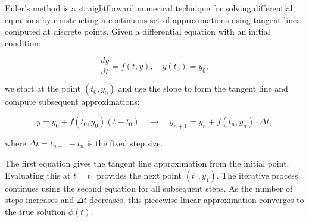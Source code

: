 Euler's method is a straightforward numerical technique for solving differential equations by constructing a continuous set of approximations using tangent lines computed at discrete points.
Given a differential equation with an initial condition:

\[
\frac{dy}{dt} = f(t, y), \quad y(t_0) = y_0,
\]

we start at the point \((t_0, y_0)\) and use the slope to form the tangent line and compute subsequent approximations:

\[
y = y_0 + f(t_0, y_0)(t - t_0)
\quad \rightarrow \quad
y_{n+1} = y_n + f(t_n, y_n) \cdot \Delta t,
\]

where \(\Delta t = t_{n+1} - t_n\) is the fixed step size.

The first equation gives the tangent line approximation from the initial point.
Evaluating this at \(t = t_1\) provides the next point \((t_1, y_1)\).
The iterative process continues using the second equation for all subsequent steps.
As the number of steps increases and \(\Delta t\) decreases, this piecewise linear approximation converges to the true solution \(\phi(t)\).